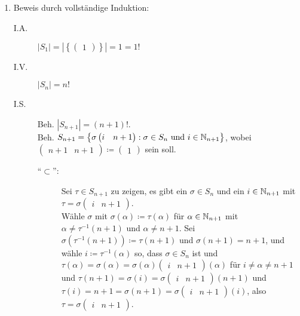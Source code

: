\documentclass[sectionformat = aufgabe]{gadsescript}
\begin{document}
\subsection{}
\begin{enumerate}[label=(\alph*)]
	\item Beweis durch vollständige Induktion:
		\begin{description}
			\item[I.A.] $ \left| S_1 \right| = \left| \left\{ \begin{pmatrix} 1 \end{pmatrix}  \right\}  \right| = 1 = 1! $ 
			\item[I.V.] $ \left| S_n \right| = n! $ 
			\item[I.S.] Beh. $ \left| S_{n + 1}  \right| = (n + 1)! $.\\
				Beh. $ S_{n + 1} = \left\{ \sigma \begin{pmatrix} i & n + 1 \end{pmatrix} : \sigma \in S_{n} \text{ und } i \in \mathbb{N} _{n + 1}  \right\}  $, wobei $ \begin{pmatrix} n + 1 & n + 1 \end{pmatrix} \coloneqq \begin{pmatrix} 1 \end{pmatrix}  $ sein soll.
				\begin{description}
					\item[``$ \subset  $'':] Sei $ \tau \in S_{n + 1}  $ zu zeigen, es gibt ein $ \sigma \in S_n $ und ein $ i \in \mathbb{N} _{n + 1}  $ mit $ \tau = \sigma \begin{pmatrix} i & n + 1 \end{pmatrix}  $.\\
						Wähle $ \sigma $ mit $ \sigma(\alpha) \coloneqq \tau(\alpha) $ für $ \alpha \in \mathbb{N} _{n + 1}  $ mit $ \alpha \neq \tau^{-1} ( n + 1 ) $ und $ \alpha \neq n + 1 $. Sei $ \sigma(\tau^{-1} (n+1)) \coloneqq \tau(n + 1) $ und $ \sigma( n + 1 ) = n + 1 $,
						und wähle $ i \coloneqq \tau^{-1} (\alpha) $ so,
						dass $ \sigma \in S_n $ ist und $ \tau(\alpha) = \sigma(\alpha) = \sigma(\alpha) \begin{pmatrix} i & n + 1 \end{pmatrix} (\alpha)$ für $ i \neq \alpha \neq n + 1 $ und $ \tau(n + 1) = \sigma(i) = \sigma \begin{pmatrix} i & n + 1 \end{pmatrix} ( n + 1 ) $ 
						und $ \tau (i) = n + 1 = \sigma(n + 1) = \sigma \begin{pmatrix} i & n + 1 \end{pmatrix} (i) $, also $ \tau = \sigma \begin{pmatrix} i & n + 1 \end{pmatrix}  $.

\end{description}
\end{description}
\end{enumerate}
\end{document}
